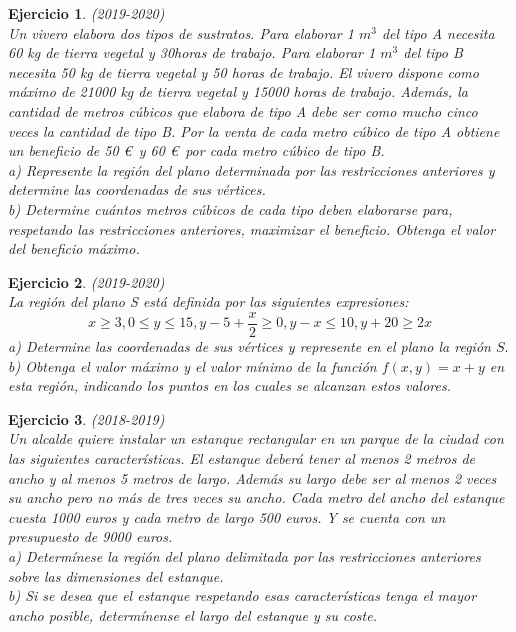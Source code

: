 \documentclass[12pt, a4paper]{amsart}
\newtheorem{ejer}{Ejercicio}
\begin{document}
\begin{ejer}\em (2019-2020)\\
Un vivero elabora dos tipos de sustratos. Para elaborar 1 $m^3$ del tipo A necesita 60 kg de tierra vegetal y 30horas de trabajo. Para elaborar 1 $m^3$ del tipo B necesita 50 kg de tierra vegetal y 50 horas de trabajo. El vivero
dispone como máximo de 21000 kg de tierra vegetal y 15000 horas de trabajo. Además, la cantidad de metros cúbicos que elabora de tipo A debe ser como mucho cinco veces la cantidad de tipo B. Por la venta de cada metro cúbico de tipo A obtiene un beneficio de 50 \euro\ y 60 \euro\ por cada metro cúbico de tipo B.\\
a) Represente la región del plano determinada por las restricciones anteriores y determine las coordenadas de sus vértices.\\
b) Determine cuántos metros cúbicos de cada tipo deben elaborarse para, respetando las restricciones anteriores, maximizar el beneficio. Obtenga el valor del beneficio máximo.
\end{ejer}

\begin{ejer}\em (2019-2020)\\
La región del plano S está definida por las siguientes expresiones:
\[
x\geq 3, 0\leq y\leq 15, y-5+\frac{x}{2}\geq 0, y-x\leq 10, y+20\geq 2x
\]
a) Determine las coordenadas de sus vértices y represente en el plano la región $S.$\\
b) Obtenga el valor máximo y el valor mínimo de la función $f (x, y) = x + y$ en esta región, indicando los puntos en los cuales se alcanzan estos valores.
\end{ejer}

\begin{ejer}\em (2018-2019)\\
Un alcalde quiere instalar un estanque rectangular en un parque de la ciudad con las siguientes características. El estanque deberá tener al menos 2 metros de ancho y al menos 5 metros de largo. Además su largo debe ser al menos 2 veces su ancho pero no más de tres veces su ancho. Cada metro del ancho del estanque cuesta 1000 euros y cada metro de largo 500 euros. Y se cuenta con un presupuesto de 9000 euros.\\
a) Determínese la región del plano delimitada por las restricciones anteriores sobre las dimensiones del estanque.\\
b) Si se desea que el estanque respetando esas características tenga el mayor ancho posible, determínense el largo del estanque y su coste.
\end{ejer}
\end{document}
